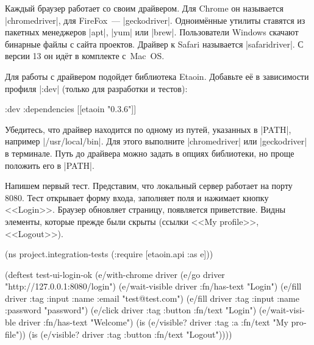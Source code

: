 
Каждый браузер работает со своим драйвером. Для Chrome он называется
\spverb|chromedriver|, для FireFox~--- \spverb|geckodriver|. Одноим\"{е}нные утилиты
ставятся из пакетных менеджеров \spverb|apt|, \spverb|yum| или
\spverb|brew|. Пользователи Windows скачают бинарные файлы с сайта
проектов. Драйвер к Safari называется \spverb|safaridriver|. С версии 13 он
ид\"{е}т в комплекте с~Mac~OS.


Для работы с драйвером подойдет библиотека Etaoin.
Добавьте е\"{е} в зависимости профиля \spverb|:dev| (только для разработки и тестов):

\begin{english}
  \begin{clojure}
:dev {:dependencies [[etaoin "0.3.6"]]}
  \end{clojure}
\end{english}

Убедитесь, что драйвер находится по одному из путей, указанных в \spverb|PATH|,
например \spverb|/usr/local/bin|. Для этого выполните \spverb|chromedriver| или
\spverb|geckodriver| в терминале. Путь до драйвера можно задать в опциях
библиотеки, но проще положить его в \spverb|PATH|.


Напишем первый тест. Представим, что локальный сервер работает на порту
8080. Тест открывает форму входа, заполняет поля и нажимает кнопку
<<Login>>. Браузер обновляет страницу, появляется приветствие. Видны элементы,
которые прежде были скрыты (ссылки <<My profile>>, <<Logout>>).

\begin{english}
  \begin{clojure}
(ns project.integration-tests
  (:require [etaoin.api :as e]))

(deftest test-ui-login-ok
  (e/with-chrome {} driver
    (e/go driver "http://127.0.0.1:8080/login")
    (e/wait-visible driver {:fn/has-text "Login"})
    (e/fill driver {:tag :input :name :email} "test@test.com")
    (e/fill driver {:tag :input :name :password} "password")
    (e/click driver {:tag :button :fn/text "Login"})
    (e/wait-visible driver {:fn/has-text "Welcome"})
    (is (e/visible? driver {:tag :a :fn/text "My profile"}))
    (is (e/visible? driver {:tag :button :fn/text "Logout"}))))
  \end{clojure}
\end{english}

